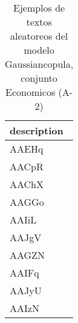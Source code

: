 \begin{table}[H]
\centering
\fontsize{8}{14}\selectfont
\caption{Ejemplos de textos aleatoreos del modelo Gaussiancopula, conjunto Economicos (A-2)}
\label{table-sample10-economicos-a-2-gaussiancopula-text}
\begin{tabular}{|m{50em}|}
\hline
\rowcolor[gray]{0.8}
description \\
\hline AAEHq \\
\hline AACpR \\
\hline AAChX \\
\hline AAGGo \\
\hline AAIiL \\
\hline AAJgV \\
\hline AAGZN \\
\hline AAIFq \\
\hline AAJyU \\
\hline AAIzN \\
\hline
\end{tabular}
\end{table}
